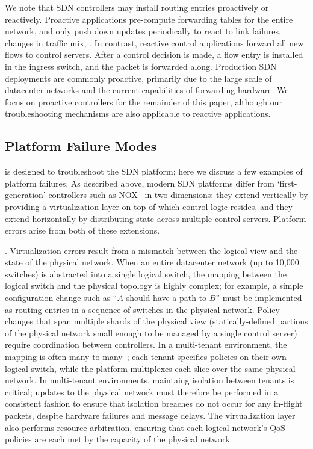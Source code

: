 We note that SDN controllers may install routing entries proactively or reactively.
Proactive applications pre-compute forwarding tables for the entire network,
and only push down updates periodically to react to link failures, changes in
traffic mix, \etc. In contrast, reactive control applications forward all new flows to
control servers. After a control decision is made, a flow entry is installed
in the ingress switch, and the packet is forwarded along.
Production SDN deployments are commonly proactive, primarily due to the large
scale of datacenter networks and the current capabilities of forwarding hardware.
We focus on proactive controllers for the remainder of this paper,
although our troubleshooting mechanisms are also applicable to reactive
applications.

\subsection{Platform Failure Modes}

\projectname{} is designed to troubleshoot the SDN platform; here we discuss a few examples of platform failures. 
As described above, modern SDN platforms differ from
`first-generation' controllers such as NOX~\cite{nox} in two dimensions: 
they extend vertically by providing a virtualization layer on top of
which control logic resides, and they extend horizontally by
distributing state across multiple control servers. Platform errors arise from both of
these extensions.

. Virtualization errors result from a mismatch between the logical
view and the state of the physical network. When an entire datacenter
network (up to 10,000 switches) is abstracted into a single logical switch,
the mapping between the logical switch and the
physical topology is highly complex; for example, a simple configuration
change such as ``$A$ should have a path to $B$'' must be implemented as routing entries in a sequence
of switches in the physical network. Policy changes 
that span multiple shards of the physical view (statically-defined
partions of the physical network small enough to be managed by a single control
server) require coordination between controllers. In a multi-tenant environment, the mapping is often
many-to-many~\cite{Casado:2010:VNF:1921151.1921162}; each tenant specifies
policies on their own logical switch, while the platform multiplexes each
slice over the same physical network. In multi-tenant environments, maintaing isolation
between tenants is critical; updates to the physical network must therefore be
performed in a consistent fashion to ensure that isolation breaches do not occur
for any in-flight packets, despite hardware failures and message delays. The virtualization layer also performs resource arbitration,
ensuring that each logical network's QoS policies are each met by the capacity of
the physical network.

